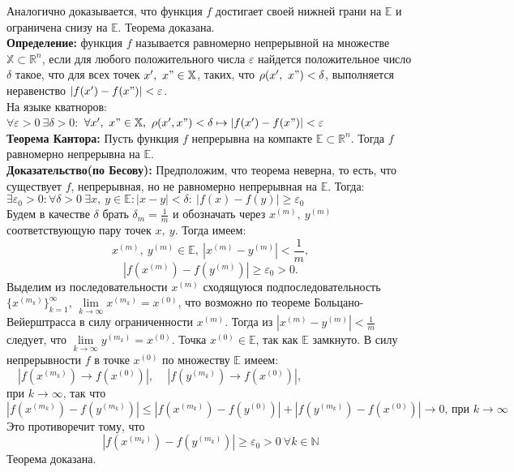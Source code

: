 \documentclass[a4paper,14pt]{extreport}
\begin{document}
Аналогично доказывается, что функция $f$ достигает своей нижней грани на $\mathbb{E}$ и ограничена снизу на $\mathbb{E}$. Теорема доказана. 
\\[2mm]\textbf{Определение:} функция $f$ называется равномерно непрерывной на множестве $\mathbb{X} \subset \mathbb{R}^n$, 
если для любого положительного числа $\varepsilon$ найдется положительное число $\delta$ такое, что
для всех точек $x', ~ x" \in \mathbb{X}$, таких, что $\rho(x', ~x") < \delta$, выполняется неравенство
$|f(x') - f(x")| < \varepsilon$. \\На языке кватноров:
\\[2mm]$\forall \varepsilon > 0 ~\exists\delta > 0:$ $\forall x', ~x" \in \mathbb{X}, ~\rho(x', x") < \delta \mapsto |f(x') - f(x")| < \varepsilon$
\\[2mm]\textbf{Теорема Кантора:} Пусть функция $f$ непрерывна на компакте $\mathbb{E} \subset \mathbb{R}^n$. Тогда $f$
равномерно непрерывна на $\mathbb{E}$.
\\[2mm]\textbf{Доказательство(по Бесову):} Предположим, что теорема неверна, то есть, что существует $f$, непрерывная, но не равномерно
непрерывная на $\mathbb{E}$. Тогда:
\\$ \exists \varepsilon_0 > 0 : \forall \delta > 0 ~\exists x, ~y \in \mathbb{E}: |x - y| < \delta: ~ |f(x) - f(y)| \geq \varepsilon_0$
\\Будем в качестве $\delta$ брать $\delta_m = \frac{1}{m}$ и обозначать через $x^{(m)}, ~y^{(m)}$ соответствующую пару точек $x, ~y$. Тогда имеем:
$$x^{(m)}, ~y^{(m)} \in \mathbb{E}, ~|x^{(m)} - y^{(m)}| < \frac{1}{m},$$
$$|f(x^{(m)}) - f(y^{(m)})| \geq \varepsilon_0 > 0.$$
Выделим из последовательности ${x^{(m)}}$ сходящуюся подпоследовательность $\{x^{(m_k)}\}_{k = 1}^\infty$,
$\lim\limits_{k \to \infty}x^{(m_k)} = x^{(0)}$, что возможно по теореме Больцано-Вейерштрасса в силу ограниченности
$x^{(m)}$. Тогда из $|x^{(m)} - y^{(m)}| < \frac{1}{m}$ следует, что $\lim\limits_{k \to \infty}y^{(m_k)} = x^{(0)}$.
Точка $x^{(0)} \in \mathbb{E}$, так как $\mathbb{E}$ замкнуто. В силу непрерывности $f$ в точке
$x^{(0)}$ по множеству $\mathbb{E}$ имеем:
$\quad|f(x^{(m_k)}) \to f(x^{(0)})|$, $\quad|f(y^{(m_k)}) \to f(x^{(0)})|$, \\ при $k \to \infty$, так что
$$|f(x^{(m_k)}) - f(y^{(m_k)})| \leq  |f(x^{(m_k)}) - f(y^{(0)})| + |f(y^{(m_k)}) - f(x^{(0)})| \to 0 \text{, при } k \to \infty$$
Это противоречит тому, что 
$$|f(x^{(m_k)}) - f(y^{(m_k)})| \geq \varepsilon_0 > 0 ~\forall k \in \mathbb{N}$$
Теорема доказана.
\end{document}

